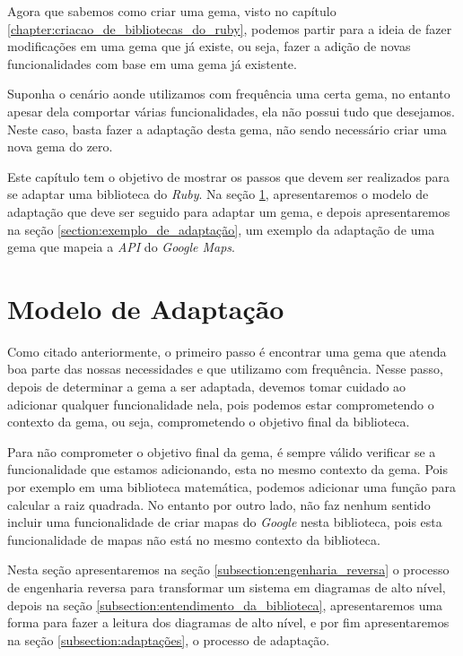 Agora que sabemos como criar uma gema, visto no capítulo \ref{chapter:criacao_de_bibliotecas_do_ruby},
podemos partir para a ideia de fazer modificações em uma gema que já existe, ou seja, fazer a adição
de novas funcionalidades com base em uma gema já existente.

Suponha o cenário aonde utilizamos com frequência uma certa gema, no entanto apesar dela comportar várias
funcionalidades, ela não possui tudo que desejamos. Neste caso, basta fazer a adaptação desta gema, não
sendo necessário criar uma nova gema do zero.

Este capítulo tem o objetivo de mostrar os passos que devem ser realizados para se adaptar uma
biblioteca do \emph{Ruby}. Na seção \ref{section:modelo_de_adaptação}, apresentaremos o modelo de adaptação
que deve ser seguido para adaptar um gema, e depois apresentaremos na seção \ref{section:exemplo_de_adaptação},
um exemplo da adaptação de uma gema que mapeia a \emph{API} do \emph{Google Maps}.


\section{Modelo de Adaptação}
\label{section:modelo_de_adaptação}


Como citado anteriormente, o primeiro passo é encontrar uma gema que atenda boa parte das nossas
necessidades e que utilizamo com frequência. Nesse passo, depois de determinar a gema a ser adaptada,
devemos tomar cuidado ao adicionar qualquer funcionalidade nela, pois podemos estar comprometendo o
contexto da gema, ou seja, comprometendo o objetivo final da biblioteca.

Para não comprometer o objetivo final da gema, é sempre válido verificar se a funcionalidade
que estamos adicionando, esta no mesmo contexto da gema. Pois por exemplo em uma biblioteca matemática,
podemos adicionar uma função para calcular a raiz quadrada. No entanto por outro lado,
não faz nenhum sentido incluir uma funcionalidade de criar mapas do \emph{Google} nesta biblioteca,
pois esta funcionalidade de mapas não está no mesmo contexto da biblioteca.

Nesta seção apresentaremos na seção \ref{subsection:engenharia_reversa} o processo de engenharia
reversa para transformar um sistema em diagramas de alto nível, depois na seção
\ref{subsection:entendimento_da_biblioteca}, apresentaremos uma forma para fazer a leitura dos
diagramas de alto nível, e por fim apresentaremos na seção \ref{subsection:adaptações}, o processo
de adaptação.


